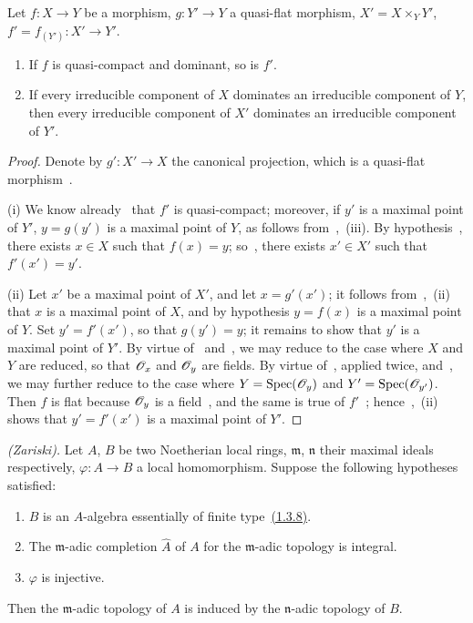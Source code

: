 \begin{proposition}[2.3.7]
\label{IV.2.3.7}
Let $f:X\to Y$ be a morphism, $g:Y'\to Y$ a quasi-flat morphism, $X'=X\times_Y Y'$, $f'=f_{(Y')}:X'\to Y'$.
\begin{enumerate}
  \item[\textup{(i)}] If $f$ is quasi-compact and dominant, so is $f'$.
  \item[\textup{(ii)}] If every irreducible component of $X$ dominates an irreducible component of $Y$, then every irreducible component of $X'$ dominates an irreducible component of $Y'$.
\end{enumerate}
\end{proposition}

\begin{proof}
Denote by $g':X'\to X$ the canonical projection, which is a quasi-flat morphism~.

(i) We know already~ that $f'$ is quasi-compact; moreover, if $y'$ is a maximal point of $Y'$, $y=g(y')$ is a maximal point of $Y$, as follows from~,~(iii).
By hypothesis~, there exists $x\in X$ such that $f(x)=y$; so~, there exists $x'\in X'$ such that $f'(x')=y'$.

(ii) Let $x'$ be a maximal point of $X'$, and let $x=g'(x')$; it follows from~,~(ii) that $x$ is a maximal point of $X$, and by hypothesis $y=f(x)$ is a maximal point of $Y$.
Set $y'=f'(x')$, so that $g(y')=y$; it remains to show that $y'$ is a maximal point of $Y'$.
By virtue of~ and~, we may reduce to the case where $X$ and $Y$ are reduced, so that $\mathscr{O}_x$ and $\mathscr{O}_y$ are fields.
By virtue of~, applied twice, and~, we may further reduce to the case where $Y=\operatorname{Spec}(\mathscr{O}_y)$ and $Y'=\operatorname{Spec}(\mathscr{O}_{y'})$.
Then $f$ is flat because $\mathscr{O}_y$ is a field~, and the same is true of $f'$~; hence~,~(ii) shows that $y'=f'(x')$ is a maximal point of $Y'$.
\end{proof}

\begin{corollary}[2.3.8]
\label{IV.2.3.8}
\emph{(Zariski).}
Let $A$, $B$ be two Noetherian local rings, $\mathfrak{m}$, $\mathfrak{n}$ their maximal ideals respectively, $\varphi:A\to B$ a local homomorphism. Suppose the following hypotheses satisfied:
\begin{enumerate}
  \item[$1^\circ$] $B$ is an $A$-algebra essentially of finite type~{\hyperref[IV.1.3.8]{(1.3.8)}}.
  \item[$2^\circ$] The $\mathfrak{m}$-adic completion $\widehat{A}$ of $A$ for the $\mathfrak{m}$-adic topology is integral.
  \item[$3^\circ$] $\varphi$ is injective.
\end{enumerate}
Then the $\mathfrak{m}$-adic topology of $A$ is induced by the $\mathfrak{n}$-adic topology of $B$.
\end{corollary}

